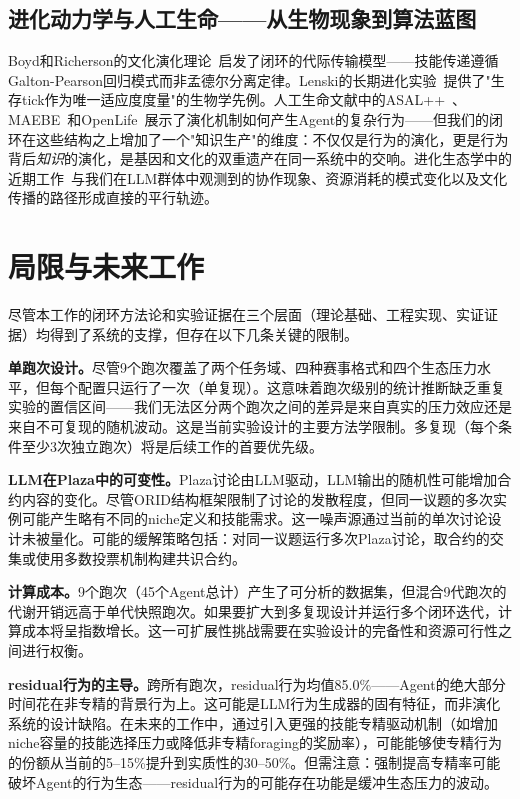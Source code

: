 \documentclass[12pt,a4paper]{ctexart}
\begin{document}
\subsection{进化动力学与人工生命——从生物现象到算法蓝图}

Boyd和Richerson的文化演化理论~\cite{boyd1985culture}启发了闭环的代际传输模型——技能传递遵循Galton-Pearson回归模式而非孟德尔分离定律。Lenski的长期进化实验~\cite{lenski2003evolutionary}提供了"生存tick作为唯一适应度度量"的生物学先例。人工生命文献中的ASAL++~\cite{asal2025}、MAEBE~\cite{maebe2025}和OpenLife~\cite{openlife2026}展示了演化机制如何产生Agent的复杂行为——但我们的闭环在这些结构之上增加了一个"知识生产"的维度：不仅仅是行为的演化，更是行为背后\emph{知识}的演化，是基因和文化的双重遗产在同一系统中的交响。进化生态学中的近期工作~\cite{ecologywords2025,energy2token2026,koster2024cultural}与我们在LLM群体中观测到的协作现象、资源消耗的模式变化以及文化传播的路径形成直接的平行轨迹。

\section{局限与未来工作}

尽管本工作的闭环方法论和实验证据在三个层面（理论基础、工程实现、实证证据）均得到了系统的支撑，但存在以下几条关键的限制。

\textbf{单跑次设计。}尽管9个跑次覆盖了两个任务域、四种赛事格式和四个生态压力水平，但每个配置只运行了一次（单复现）。这意味着跑次级别的统计推断缺乏重复实验的置信区间——我们无法区分两个跑次之间的差异是来自真实的压力效应还是来自不可复现的随机波动。这是当前实验设计的主要方法学限制。多复现（每个条件至少3次独立跑次）将是后续工作的首要优先级。

\textbf{LLM在Plaza中的可变性。}Plaza讨论由LLM驱动，LLM输出的随机性可能增加合约内容的变化。尽管ORID结构框架限制了讨论的发散程度，但同一议题的多次实例可能产生略有不同的niche定义和技能需求。这一噪声源通过当前的单次讨论设计未被量化。可能的缓解策略包括：对同一议题运行多次Plaza讨论，取合约的交集或使用多数投票机制构建共识合约。

\textbf{计算成本。}9个跑次（45个Agent总计）产生了可分析的数据集，但混合9代跑次的代谢开销远高于单代快照跑次。如果要扩大到多复现设计并运行多个闭环迭代，计算成本将呈指数增长。这一可扩展性挑战需要在实验设计的完备性和资源可行性之间进行权衡。

\textbf{residual行为的主导。}跨所有跑次，residual行为均值85.0\%——Agent的绝大部分时间花在非专精的背景行为上。这可能是LLM行为生成器的固有特征，而非演化系统的设计缺陷。在未来的工作中，通过引入更强的技能专精驱动机制（如增加niche容量的技能选择压力或降低非专精foraging的奖励率），可能能够使专精行为的份额从当前的5--15\%提升到实质性的30--50\%。但需注意：强制提高专精率可能破坏Agent的行为生态——residual行为的可能存在功能是缓冲生态压力的波动。
\end{document}
